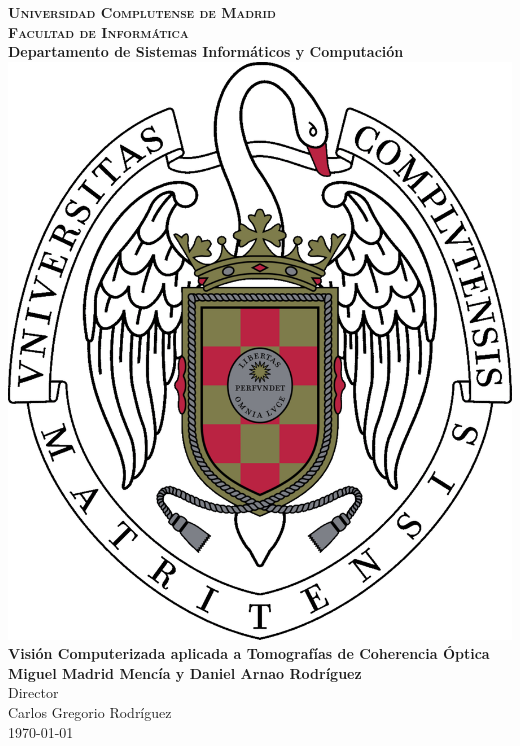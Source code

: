 
\begin{titlepage}
\begin{center}

  \textbf{\textsc{\LARGE Universidad Complutense de Madrid}}\\[1cm]
  \textbf{\textsc{\Large Facultad de Informática}}\\
  \textbf{Departamento de Sistemas Informáticos y Computación}\\[2cm]
  \includegraphics[scale=0.17]{imagenes/logos/logo-ucm.pdf}\\[2cm]
  \textbf{\LARGE Visión Computerizada aplicada a Tomografías de Coherencia Óptica}\\[1cm]
  \textbf{\large Miguel Madrid Mencía y Daniel Arnao Rodríguez}\\[2cm]
  Director\\
  \large Carlos Gregorio Rodríguez\\
  \vfill
  \today
\end{center}
\end{titlepage}
